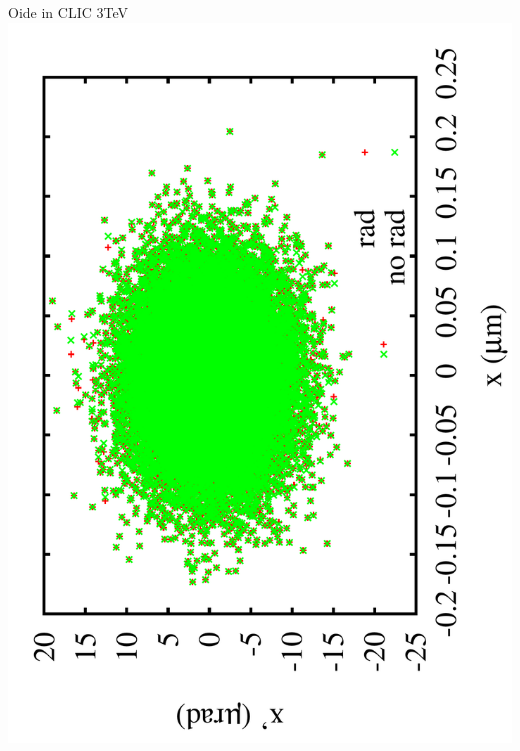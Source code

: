 \documentclass{beamer}
\begin{document}
\begin{frame}{Oide in CLIC 3TeV}\,\vspace*{-0.3cm}
 \includegraphics[scale=0.2,angle=-90]{plotxrad.pdf}

\end{frame}
\end{document}
